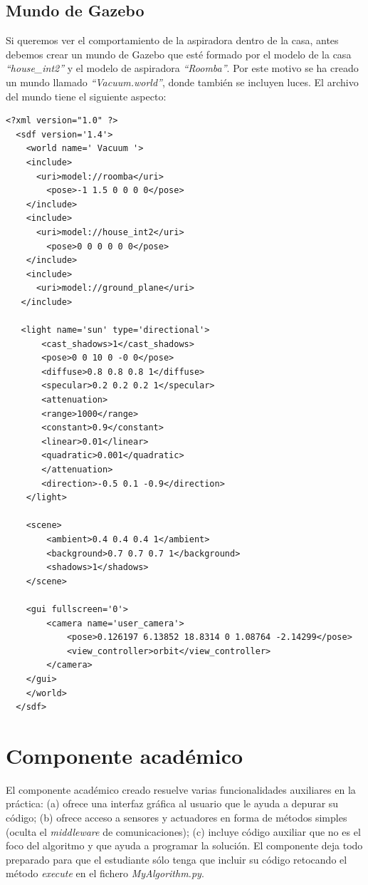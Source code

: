 \subsection{Mundo de Gazebo}
Si queremos ver el comportamiento de la aspiradora dentro de la casa, antes debemos crear un mundo de Gazebo que esté formado por el modelo de la casa \textit{``house\_int2''} y el modelo de aspiradora \textit{``Roomba''}. Por este motivo se ha creado un mundo llamado \textit{``Vacuum.world''}, donde también se incluyen luces. El archivo del mundo tiene el siguiente aspecto:

\vspace{20pt}
	\begin{lstlisting}[frame=single]
<?xml version="1.0" ?>
  <sdf version='1.4'>
    <world name=' Vacuum '>
    <include>
      <uri>model://roomba</uri>
        <pose>-1 1.5 0 0 0 0</pose>
    </include>
    <include>
      <uri>model://house_int2</uri>
        <pose>0 0 0 0 0 0</pose>
    </include>
    <include>
      <uri>model://ground_plane</uri>
   </include>

   <light name='sun' type='directional'>
       <cast_shadows>1</cast_shadows>
       <pose>0 0 10 0 -0 0</pose>
       <diffuse>0.8 0.8 0.8 1</diffuse>
       <specular>0.2 0.2 0.2 1</specular>
       <attenuation>
       <range>1000</range>
       <constant>0.9</constant>
       <linear>0.01</linear>
       <quadratic>0.001</quadratic>
       </attenuation>
       <direction>-0.5 0.1 -0.9</direction>
    </light>

    <scene>
        <ambient>0.4 0.4 0.4 1</ambient>
        <background>0.7 0.7 0.7 1</background>
        <shadows>1</shadows>
    </scene>

    <gui fullscreen='0'>
        <camera name='user_camera'>
            <pose>0.126197 6.13852 18.8314 0 1.08764 -2.14299</pose>
            <view_controller>orbit</view_controller>
        </camera>
    </gui>
    </world>
  </sdf>

	\end{lstlisting}

\section{Componente académico}
El componente académico creado resuelve varias funcionalidades auxiliares en la práctica: (a) ofrece una interfaz gráfica al usuario que le ayuda a depurar su código; (b) ofrece acceso a sensores y actuadores en forma de métodos simples (oculta el \textit{middleware} de comunicaciones); (c) incluye código auxiliar que no es el foco del algoritmo y que ayuda a programar la solución. El componente deja todo preparado para que el estudiante sólo tenga que incluir su código retocando el método \textit{execute} en el fichero \textit{MyAlgorithm.py}.\\

